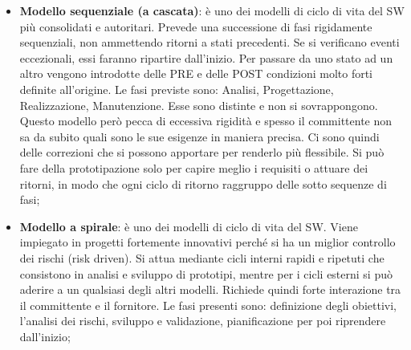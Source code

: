 \begin{itemize}
	\item \textbf{Modello sequenziale (a cascata)}: è uno dei modelli di ciclo di vita del SW più consolidati e autoritari. Prevede una successione di fasi rigidamente sequenziali, non ammettendo ritorni a stati precedenti. Se si verificano eventi eccezionali, essi faranno ripartire dall'inizio. \newline
Per passare da uno stato ad un altro vengono introdotte delle PRE e delle POST condizioni molto forti definite all'origine. Le fasi previste sono: Analisi, Progettazione, Realizzazione, Manutenzione. Esse sono distinte e non si sovrappongono. \newline
Questo modello però pecca di eccessiva rigidità e spesso il committente non sa da subito quali sono le sue esigenze in maniera precisa.\newline
Ci sono quindi delle correzioni che si possono apportare per renderlo più flessibile. Si può fare della prototipazione solo per capire meglio i requisiti o attuare dei ritorni, in modo che ogni ciclo di ritorno raggruppo delle sotto sequenze di fasi;

	\item \textbf{Modello a spirale}: è uno dei modelli di ciclo di vita del SW. Viene impiegato in progetti fortemente innovativi perché si ha un miglior controllo dei rischi (risk driven). \newline
Si attua mediante cicli interni rapidi e ripetuti che consistono in analisi e sviluppo di prototipi, mentre per i cicli esterni si può aderire a un qualsiasi degli altri modelli. \newline
Richiede quindi forte interazione tra il committente e il fornitore. Le fasi presenti sono: definizione degli obiettivi, l'analisi dei rischi, sviluppo e validazione, pianificazione per poi riprendere dall'inizio;

\end{itemize}